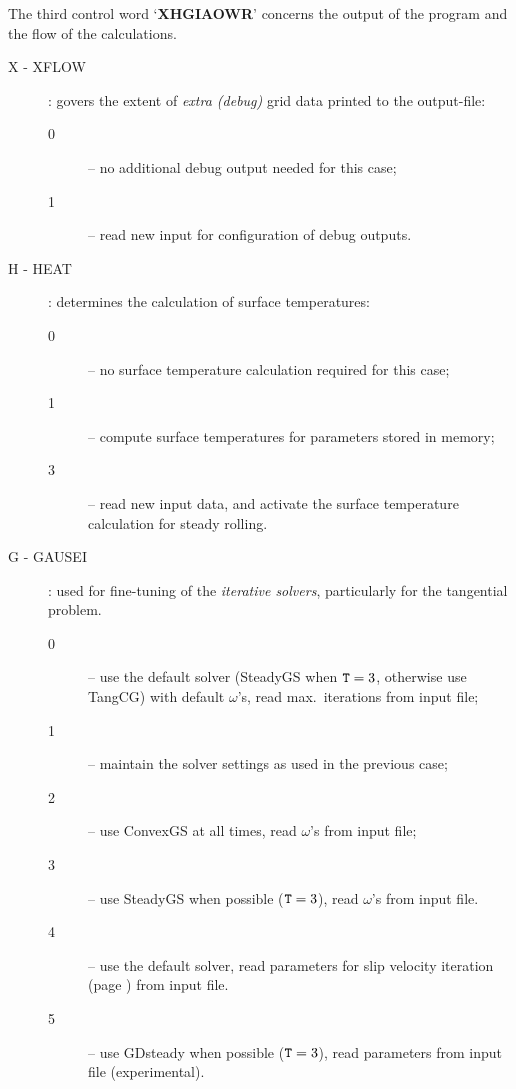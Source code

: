 \documentclass[12pt]{report}
\begin{document}
The third control word `{\bf XHGIAOWR}' concerns the output of
the program and the flow of the calculations.
\begin{description}
\item[X - XFLOW] \label{x-digit} : govers the extent of {\em extra
        (debug)\/} grid data printed to the output-file:
\begin{description}
\item[0] -- no additional debug output needed for this case;
\item[1] -- read new input for configuration of debug outputs.
\end{description}

\item[H - HEAT]\label{h-digit} : determines the calculation of surface
        temperatures:
\begin{description}
\item[0] -- no surface temperature calculation required for this case;
\item[1] -- compute surface temperatures for parameters stored in memory;
\item[3] -- read new input data, and activate the surface temperature
        calculation for steady rolling.
\end{description}

\item[G - GAUSEI] \label{g-digit} : used for fine-tuning of the {\em iterative
        solvers\/}, particularly for the tangential problem.
\begin{description}
\item[0] -- use the default solver (SteadyGS when ${\tt T}=3$,
        otherwise use TangCG) with default $\omega$'s, read max.\
        iterations from input file;
\item[1] -- maintain the solver settings as used in the previous case;
\item[2] -- use ConvexGS at all times, read $\omega$'s from input file;
\item[3] -- use SteadyGS when possible (${\tt T}=3$), read $\omega$'s from
        input file.
\item[4] -- use the default solver, read parameters for slip velocity
        iteration (page \pageref{itm:slip_veloc}) from input file.
\item[5] -- use GDsteady when possible (${\tt T}=3$), read parameters
        from input file (experimental).
\end{description}


\end{description}
\end{document}
